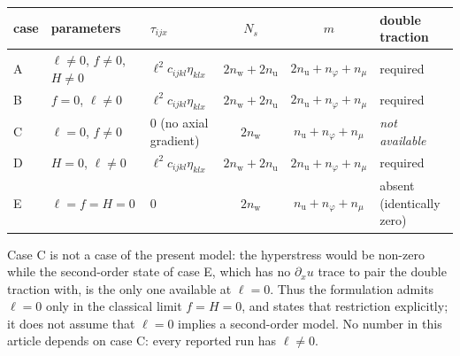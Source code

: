 \begin{center}
\renewcommand{\arraystretch}{1.15}
\begin{tabular}{@{}lllccl@{}}
\toprule
case & parameters & $\tau_{ijx}$ & $N_s$ & $m$ & double traction \\
\midrule
A & $\ell\neq0$, $f\neq0$, $H\neq0$ & $\ell^{2}c_{ijkl}\eta_{klx}$ & $2n_{\mathrm w}+2n_{\mathrm u}$ & $2n_{\mathrm u}+n_\varphi+n_\mu$ & required \\
B & $f=0$, $\ell\neq0$ & $\ell^{2}c_{ijkl}\eta_{klx}$ & $2n_{\mathrm w}+2n_{\mathrm u}$ & $2n_{\mathrm u}+n_\varphi+n_\mu$ & required \\
C & $\ell=0$, $f\neq0$ & $0$ (no axial gradient) & $2n_{\mathrm w}$ & $n_{\mathrm u}+n_\varphi+n_\mu$ & \emph{not available} \\
D & $H=0$, $\ell\neq0$ & $\ell^{2}c_{ijkl}\eta_{klx}$ & $2n_{\mathrm w}+2n_{\mathrm u}$ & $2n_{\mathrm u}+n_\varphi+n_\mu$ & required \\
E & $\ell=f=H=0$ & $0$ & $2n_{\mathrm w}$ & $n_{\mathrm u}+n_\varphi+n_\mu$ & absent (identically zero) \\
\bottomrule
\end{tabular}
\end{center}

\noindent Case C is not a case of the present model: the hyperstress would be non-zero while the
second-order state of case E, which has no $\partial_x u$ trace to pair the
double traction with, is the only one available at $\ell=0$.  Thus the formulation admits $\ell=0$ only in the classical limit $f=H=0$, and states that restriction explicitly; it does not assume that $\ell=0$ implies a second-order model.  No
number in this article depends on case C: every reported run has $\ell\neq0$.


